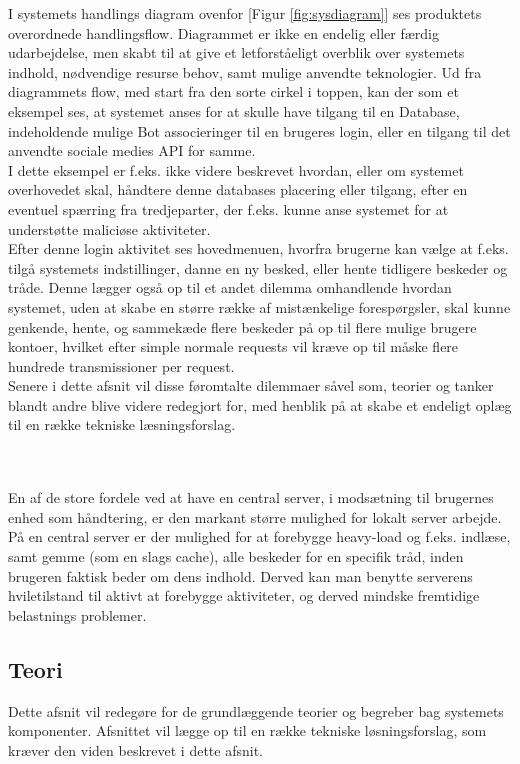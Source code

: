 I systemets handlings diagram ovenfor [Figur \ref{fig:sysdiagram}] ses produktets overordnede handlingsflow. Diagrammet er ikke en endelig eller færdig udarbejdelse, men skabt til at give et letforståeligt overblik over systemets indhold, nødvendige resurse behov, samt mulige anvendte teknologier. Ud fra diagrammets flow, med start fra den sorte cirkel i toppen, kan der som et eksempel ses, at systemet anses for at skulle have tilgang til en Database, indeholdende mulige Bot associeringer til en brugeres login, eller en tilgang til det anvendte sociale medies API for samme.\\
I dette eksempel er f.eks. ikke videre beskrevet hvordan, eller om systemet overhovedet skal, håndtere denne databases placering eller tilgang, efter en eventuel spærring fra tredjeparter, der f.eks. kunne anse systemet for at understøtte maliciøse aktiviteter.\\
Efter denne login aktivitet ses hovedmenuen, hvorfra brugerne kan vælge at f.eks. tilgå systemets indstillinger, danne en ny besked, eller hente tidligere beskeder og tråde. Denne lægger også op til et andet dilemma omhandlende hvordan systemet, uden at skabe en større række af mistænkelige forespørgsler, skal kunne genkende, hente, og sammekæde flere beskeder på op til flere mulige brugere kontoer, hvilket efter simple normale requests vil kræve op til måske flere hundrede transmissioner per request.\\
Senere i dette afsnit vil disse føromtalte dilemmaer såvel som, teorier og tanker blandt andre blive videre redegjort for, med henblik på at skabe et endeligt oplæg til en række tekniske læsningsforslag.

\\\\

En af de store fordele ved at have en central server, i modsætning til brugernes enhed som håndtering, er den markant større mulighed for lokalt server arbejde. På en central server er der mulighed for at forebygge heavy-load og f.eks. indlæse, samt gemme (som en slags cache), alle beskeder for en specifik tråd, inden brugeren faktisk beder om dens indhold. Derved kan man benytte serverens hviletilstand til aktivt at forebygge aktiviteter, og derved mindske fremtidige belastnings problemer.


\subsection{Teori}
Dette afsnit vil redegøre for de grundlæggende teorier og begreber bag systemets komponenter. Afsnittet vil lægge op til en række tekniske løsningsforslag, som kræver den viden beskrevet i dette afsnit.

